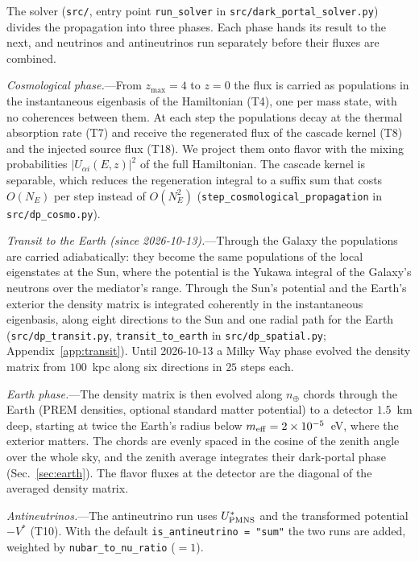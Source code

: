 \documentclass[11pt,a4paper]{article}
\newcommand{\file}[1]{\nolinkurl{#1}}
\begin{document}
The solver (\file{src/}, entry point \texttt{run\_solver} in \file{src/dark_portal_solver.py})
divides the propagation into three phases. Each phase hands its result to the next, and
neutrinos and antineutrinos run separately before their fluxes are combined.

\textit{Cosmological phase.}---From $z_{\max}=4$ to $z=0$ the flux is carried as populations
in the instantaneous eigenbasis of the Hamiltonian (T4), one per mass state, with no
coherences between them. At each step the populations decay at the thermal absorption rate
(T7) and receive the regenerated flux of the cascade kernel (T8) and the injected source flux
(T18). We project them onto flavor with the mixing probabilities $|U_{\alpha i}(E,z)|^2$ of the
full Hamiltonian. The cascade kernel is separable, which reduces the regeneration
integral to a suffix sum that costs $O(N_E)$ per step instead of $O(N_E^2)$
(\texttt{step\_cosmological\_propagation} in \file{src/dp_cosmo.py}).

\textit{Transit to the Earth (since 2026-10-13).}---Through the Galaxy the populations are
carried adiabatically: they become the same populations of the local eigenstates at the Sun,
where the potential is the Yukawa integral of the Galaxy's neutrons over the mediator's range.
Through the Sun's potential and the Earth's exterior the density matrix is integrated coherently
in the instantaneous eigenbasis, along eight directions to the Sun and one radial path for the
Earth (\file{src/dp_transit.py}, \texttt{transit\_to\_earth} in \file{src/dp_spatial.py};
Appendix~\ref{app:transit}). Until 2026-10-13 a Milky Way phase evolved the density matrix from
$100$~kpc along six directions in $25$ steps each.

\textit{Earth phase.}---The density matrix is then evolved along $n_\oplus$ chords through the
Earth (PREM densities, optional standard matter potential) to a detector $1.5$~km deep, starting
at twice the Earth's radius below $m_{\rm eff} = 2\times10^{-5}$~eV, where the exterior matters.
The chords are evenly spaced in the cosine of the zenith angle over the whole sky, and the zenith
average integrates their dark-portal phase (Sec.~\ref{sec:earth}). The flavor fluxes at the
detector are the diagonal of the averaged density matrix.

\textit{Antineutrinos.}---The antineutrino run uses $U^*_{\rm PMNS}$ and the transformed
potential $-V^*$ (T10). With the default \texttt{is\_antineutrino = "sum"} the two runs are
added, weighted by \texttt{nubar\_to\_nu\_ratio} ($=1$).
\end{document}
